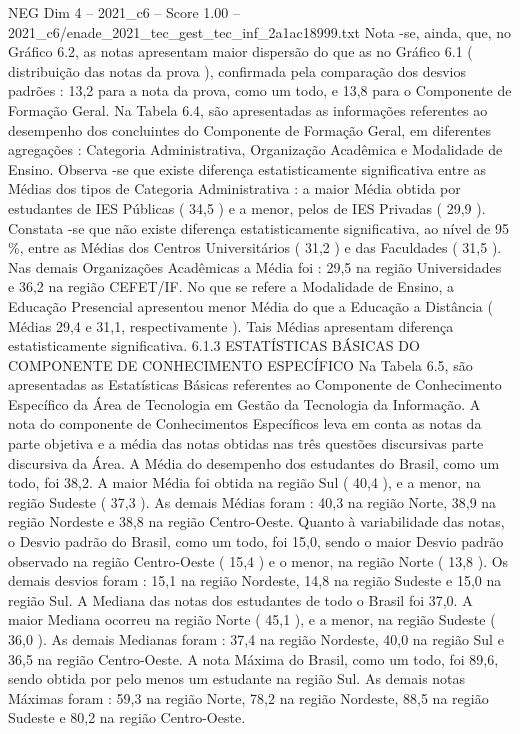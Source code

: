 \begin{textsample}{NEG Dim 4 – 2021\_c6 – Score 1.00 – 2021\_c6/enade\_2021\_tec\_gest\_tec\_inf\_2a1ac18999.txt}
Nota -se, ainda, que, no Gráfico 6.2, as notas apresentam maior dispersão do que as no Gráfico 6.1 ( distribuição das notas da prova ), confirmada pela comparação dos desvios padrões : 13,2 para a nota da prova, como um todo, e 13,8 para o Componente de Formação Geral.
Na Tabela 6.4, são apresentadas as informações referentes ao desempenho dos concluintes do Componente de Formação Geral, em diferentes agregações : Categoria Administrativa, Organização Acadêmica e Modalidade de Ensino.
Observa -se que existe diferença estatisticamente significativa entre as Médias dos tipos de Categoria Administrativa : a maior Média obtida por estudantes de IES Públicas ( 34,5 ) e a menor, pelos de IES Privadas ( 29,9 ).
Constata -se que não existe diferença estatisticamente significativa, ao nível de 95 \%, entre as Médias dos Centros Universitários ( 31,2 ) e das Faculdades ( 31,5 ).
Nas demais Organizações Acadêmicas a Média foi : 29,5 na região Universidades e 36,2 na região CEFET/IF.
No que se refere a Modalidade de Ensino, a Educação Presencial apresentou menor Média do que a Educação a Distância ( Médias 29,4 e 31,1, respectivamente ).
Tais Médias apresentam diferença estatisticamente significativa. 6.1.3 ESTATÍSTICAS BÁSICAS DO COMPONENTE DE CONHECIMENTO ESPECÍFICO Na Tabela 6.5, são apresentadas as Estatísticas Básicas referentes ao Componente de Conhecimento Específico da Área de Tecnologia em Gestão da Tecnologia da Informação.
A nota do componente de Conhecimentos Específicos leva em conta as notas da parte objetiva e a média das notas obtidas nas três questões discursivas parte discursiva da Área.
A Média do desempenho dos estudantes do Brasil, como um todo, foi 38,2.
A maior Média foi obtida na região Sul ( 40,4 ), e a menor, na região Sudeste ( 37,3 ).
As demais Médias foram : 40,3 na região Norte, 38,9 na região Nordeste e 38,8 na região Centro-Oeste.
Quanto à variabilidade das notas, o Desvio padrão do Brasil, como um todo, foi 15,0, sendo o maior Desvio padrão observado na região Centro-Oeste ( 15,4 ) e o menor, na região Norte ( 13,8 ).
Os demais desvios foram : 15,1 na região Nordeste, 14,8 na região Sudeste e 15,0 na região Sul.
A Mediana das notas dos estudantes de todo o Brasil foi 37,0.
A maior Mediana ocorreu na região Norte ( 45,1 ), e a menor, na região Sudeste ( 36,0 ).
As demais Medianas foram : 37,4 na região Nordeste, 40,0 na região Sul e 36,5 na região Centro-Oeste.
A nota Máxima do Brasil, como um todo, foi 89,6, sendo obtida por pelo menos um estudante na região Sul.
As demais notas Máximas foram : 59,3 na região Norte, 78,2 na região Nordeste, 88,5 na região Sudeste e 80,2 na região Centro-Oeste.

\end{textsample}
